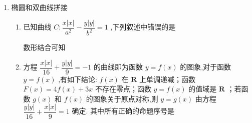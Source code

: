 \begin{enumerate}
\begin{enumerate}
\begin{jieda}
            $|AB| = 2a-e(x_1+x_2) = 6 - \dfrac{5}{3} \times \left(-\dfrac{90}{7}\right)= \dfrac{192}{7}$

            $x_M = -\dfrac{45}{7}$，代入直线方程有$y_M = -\dfrac{80}{7}$，因此$|MF| = \sqrt{\left(-\dfrac{45}{7}-5\right)^2+\left(-\dfrac{80}{7}\right)^2} = \dfrac{80}{7}\sqrt{2}$
        \end{jieda}
    \end{enumerate}
    \item 椭圆和双曲线拼接
    \begin{enumerate}
        \item 已知曲线 $C : \dfrac{x\left| x\right| }{{a}^{2}} - \dfrac{y\left| y\right| }{{b}^{2}} = 1$ ,下列叙述中错误的是
        \begin{jieda}
            数形结合可知
        \end{jieda}
        \item 方程 $\dfrac{x\left| x\right| }{16} + \dfrac{y\left| y\right| }{9} =  - 1$ 的曲线即为函数 $y = f\left( x\right)$ 的图象,对于函数 $y = f\left( x\right)$ ,有如下结论: $f\left( x\right)$ 在 $\mathbf{R}$ 上单调递减；函数 $F\left( x\right)  = {4f}\left( x\right)  + {3x}$ 不存在零点；函数 $y = f\left( x\right)$ 的值域是 $\mathbf{R}$ ；若函数 $g\left( x\right)$ 和 $f\left( x\right)$ 的图象关于原点对称,则 $y = g\left( x\right)$ 由方程 $\dfrac{y\left| y\right| }{16} + \dfrac{x\left| x\right| }{9} = 1$ 确定. 其中所有正确的命题序号是


\end{enumerate}
\end{enumerate}
